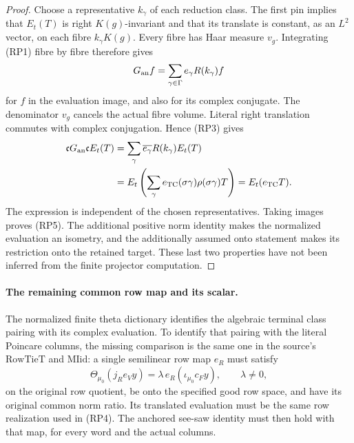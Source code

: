 \begin{proof}
Choose a representative \(k_\gamma\) of each reduction class.
The first pin implies that \(E_t(T)\) is right \(K(g)\)-invariant
and that its translate is constant, as an \(L^2\) vector, on
each fibre \(k_\gamma K(g)\). Every fibre has Haar measure
\(v_g\). Integrating (RP1) fibre by fibre therefore gives
\[
 G_{\rm an}f=\sum_{\gamma\in\Gamma}
                      e_\gamma R(k_\gamma)f
\]
for \(f\) in the evaluation image, and also for its complex
conjugate. The denominator \(v_g\) cancels the actual fibre
volume. Literal right translation commutes with complex
conjugation. Hence (RP3) gives
\[
 \begin{split}
 \mathfrak c G_{\rm an} \mathfrak c E_t(T)
   &=\sum_\gamma\overline{e_\gamma}R(k_\gamma)E_t(T)\\
   &=E_t\left(\sum_\gamma
           e_{\rm TC}(\sigma\gamma)\rho(\sigma\gamma)T\right)
     =E_t(e_{\rm TC}T).
 \end{split}
\]
The expression is independent of the chosen representatives.
Taking images proves (RP5). The additional positive norm identity
makes the normalized evaluation an isometry, and the additionally
assumed onto statement makes its restriction onto the retained
target. These last two properties have not been inferred from the
finite projector computation.
\end{proof}

\paragraph{The remaining common row map and its scalar.}
The normalized finite theta dictionary identifies the algebraic
terminal class pairing with its complex evaluation. To identify
that pairing with the literal Poincare columns, the missing
comparison is the same one in the source's \(\mathrm{RowTieT}\)
and \(\mathrm{MIid}\): a single semilinear row map \(e_R\)
must satisfy
\[
 \Theta_{\mu_0}(j_R e_Vy)=\lambda\,
              e_R(\iota_{\mu_0}c_Fy),\qquad \lambda\ne0,
                                                        \tag{RP6}
\]
on the original row quotient, be onto the specified good row
space, and have its original common norm ratio. Its translated
evaluation must be the same row realization used in (RP4).
The anchored see-saw identity must then hold with that map,
for every word and the actual columns.

